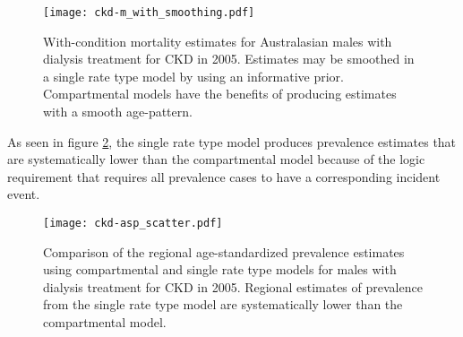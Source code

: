     \begin{figure}[h]
        \begin{center}
            \texttt{[image: ckd-m\_with\_smoothing.pdf]}
            \caption{With-condition mortality estimates for Australasian males with dialysis treatment for CKD in 2005.  Estimates may be smoothed in a single rate type model by using an informative prior.  Compartmental models have the benefits of producing estimates with a smooth age-pattern.}
            \label{fig:app-CKD smooth}
        \end{center}
    \end{figure}

As seen in figure \ref{fig:app-CKD asp}, the single rate type model produces prevalence estimates that are systematically lower than the compartmental model because of the logic requirement that requires all prevalence cases to have a corresponding incident event.

    \begin{figure}[h]
        \begin{center}
            \texttt{[image: ckd-asp\_scatter.pdf]}
            \caption{Comparison of the regional age-standardized prevalence estimates using compartmental and single rate type models for males with dialysis treatment for CKD in 2005.  Regional estimates of prevalence from the single rate type model are systematically lower than the compartmental model.}
            \label{fig:app-CKD asp}
        \end{center}
    \end{figure} 